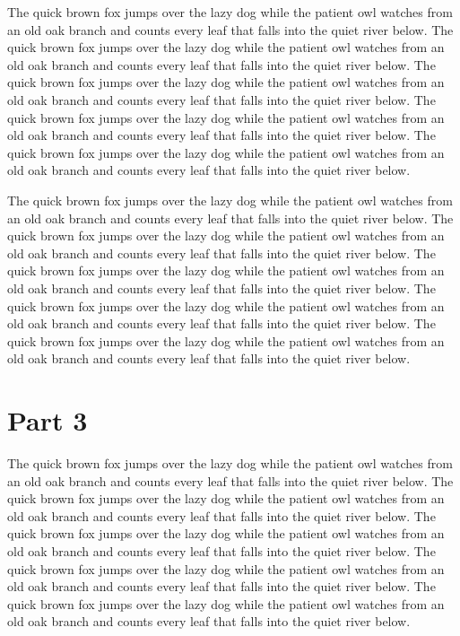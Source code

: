 The quick brown fox jumps over the lazy dog while the patient owl watches from an old oak branch and counts every leaf that falls into the quiet river below. The quick brown fox jumps over the lazy dog while the patient owl watches from an old oak branch and counts every leaf that falls into the quiet river below. The quick brown fox jumps over the lazy dog while the patient owl watches from an old oak branch and counts every leaf that falls into the quiet river below. The quick brown fox jumps over the lazy dog while the patient owl watches from an old oak branch and counts every leaf that falls into the quiet river below. The quick brown fox jumps over the lazy dog while the patient owl watches from an old oak branch and counts every leaf that falls into the quiet river below.

The quick brown fox jumps over the lazy dog while the patient owl watches from an old oak branch and counts every leaf that falls into the quiet river below. The quick brown fox jumps over the lazy dog while the patient owl watches from an old oak branch and counts every leaf that falls into the quiet river below. The quick brown fox jumps over the lazy dog while the patient owl watches from an old oak branch and counts every leaf that falls into the quiet river below. The quick brown fox jumps over the lazy dog while the patient owl watches from an old oak branch and counts every leaf that falls into the quiet river below. The quick brown fox jumps over the lazy dog while the patient owl watches from an old oak branch and counts every leaf that falls into the quiet river below.
\newpage
\section{Part 3}
The quick brown fox jumps over the lazy dog while the patient owl watches from an old oak branch and counts every leaf that falls into the quiet river below. The quick brown fox jumps over the lazy dog while the patient owl watches from an old oak branch and counts every leaf that falls into the quiet river below. The quick brown fox jumps over the lazy dog while the patient owl watches from an old oak branch and counts every leaf that falls into the quiet river below. The quick brown fox jumps over the lazy dog while the patient owl watches from an old oak branch and counts every leaf that falls into the quiet river below. The quick brown fox jumps over the lazy dog while the patient owl watches from an old oak branch and counts every leaf that falls into the quiet river below.

